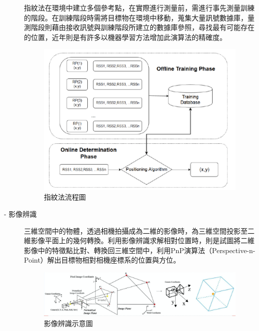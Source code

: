 \begin{description}
        \qquad
        指紋法在環境中建立多個參考點，在實際進行測量前，需進行事先測量訓練的階段。在訓練階段時需將目標物在環境中移動，蒐集大量訊號數據庫，量測階段則藉由接收訊號與訓練階段所建立的數據庫參照，尋找最有可能存在的位置\cite{survey_light2020}，近年則是有許多以機器學習方法增加此演算法的精確度。
        \begin{figure}[h]
            \centering
            \includegraphics[width=13cm]{ch2pic/fingerprinting.png}
            \caption{指紋法流程圖\cite{pic:fingerprinting}}
            \label{pic:fingerprinting}
        \end{figure}
        
        \item[- 影像辨識]\hfill 
        
        \qquad
        三維空間中的物體，透過相機拍攝成為二維的影像時，為三維空間投影至二維影像平面上的幾何轉換。利用影像辨識求解相對位置時，則是試圖將二維影像中的特徵點比對、轉換回三維空間中，利用PnP演算法（Perspective-n-Point）解出目標物相對相機座標系的位置與方位\cite{pic:image_processing}。
        
        \begin{figure}[h]
            \centering
            \includegraphics[width=15cm]{ch2pic/image_processing.png}
            \caption{影像辨識示意圖\cite{pic:image_processing}}
            \label{pic:image_processing}
        \end{figure}
        

\end{description}
